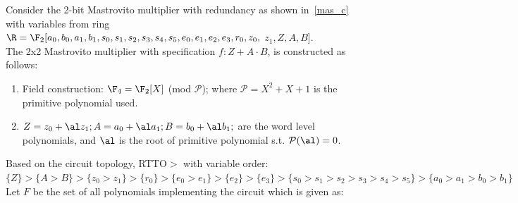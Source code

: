 \begin{Example}
Consider the 2-bit Mastrovito multiplier with redundancy as shown in~\autoref{mas_c} with variables from ring $\R=\F_2[a_0,b_0,a_1,b_1,s_0,s_1,s_2,s_3,s_4,s_5,e_0,e_1,e_2,e_3,r_0,z_0,$ $z_1,Z,A,B]$.\\%
The 2x2 Mastrovito multiplier with specification $f: Z + A\cdot B$, is constructed as follows:
\begin{enumerate}
    \item{Field construction: $\F_4 = \F_2[X]$ (mod $\mathcal{P}$); where $\mathcal{P} = X^2 + X + 1$ is the primitive polynomial used.}
    \item{$Z = z_0 +\al z_1; A = a_0 +\al a_1; B = b_0 +\al b_1;$ are the word level polynomials, and $\al$ is the root of primitive polynomial s.t. $\mathcal{P}(\al)=0$.}
\end{enumerate}
Based on the circuit topology, RTTO$>$ with variable order:
$\{Z\}>\{A>B\}>\{z_0>z_1\}>\{r_0\}>\{e_0>e_1\}>\{e_2\}>\{e_3\}>\{s_0>s_1>s_2>s_3>s_4>s_5\}>\{a_0>a_1>b_0>b_1\}$\\ 
Let $F$ be the set of all polynomials implementing the circuit which is given as:

\end{Example}
